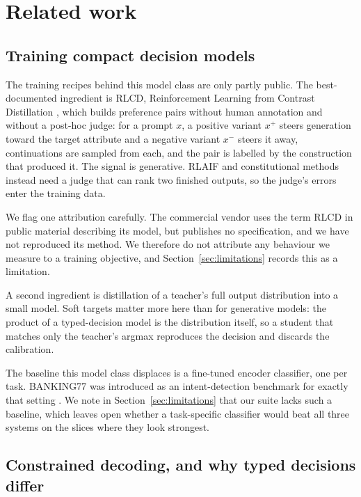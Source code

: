 \section{Related work}
\label{sec:related}

\subsection{Training compact decision models}

The training recipes behind this model class are only partly public. The
best-documented ingredient is RLCD, Reinforcement Learning from Contrast
Distillation \citep{yang2024rlcd}, which builds preference pairs without human
annotation and without a post-hoc judge: for a prompt $x$, a positive variant
$x^+$ steers generation toward the target attribute and a negative variant $x^-$
steers it away, continuations are sampled from each, and the pair is labelled by
the construction that produced it. The signal is generative. RLAIF and
constitutional methods instead need a judge that can rank two finished outputs,
so the judge's errors enter the training data.

We flag one attribution carefully. The commercial vendor uses the term RLCD in
public material describing its model, but publishes no specification, and we have
not reproduced its method. We therefore do not attribute any behaviour we measure
to a training objective, and Section~\ref{sec:limitations} records this as a
limitation.

A second ingredient is distillation of a teacher's full output distribution into a
small model. Soft targets matter more here than for generative models: the product
of a typed-decision model is the distribution itself, so a student that matches
only the teacher's argmax reproduces the decision and discards the calibration.

The baseline this model class displaces is a fine-tuned encoder classifier, one
per task. BANKING77 was introduced as an intent-detection benchmark for exactly
that setting \citep{casanueva2020banking77}. We note in
Section~\ref{sec:limitations} that our suite lacks such a baseline, which leaves
open whether a task-specific classifier would beat all three systems on the
slices where they look strongest.

\subsection{Constrained decoding, and why typed decisions differ}

